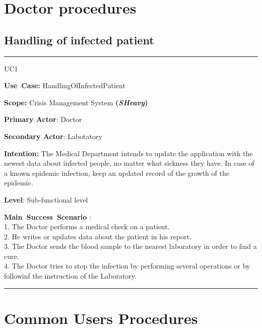 \section{Doctor procedures}

\subsection{Handling of infected patient}
\vspace{0.5cm}
\hrule
\vspace{0.5cm}
\begin{lyxlist}{UC1}
\small{
\item [\textbf{Use~Case:}] HandlingOfInfectedPatient
\item [\textbf{Scope:}] Crisis Management System \textbf{(\emph{SHeavy})}
\item [\textbf{Primary Actor}:] Doctor
\item [\textbf{Secondary Actor}:] Labotatory
\item [\textbf{Intention:}]The Medical Department intends to update
the application with the newest data about infected people, no matter what
sickness they have. In case of a known epidemic infection, keep an updated
record of the growth of the epidemic.
\item [\textbf{Level}:]Sub-functional level
\item [\textbf{Main~Success~Scenario}]:\\
1. The Doctor performs a medical check on a patient.\\
2. He writes or updates data about the patient in his report.\\
3. The Doctor sends the blood sample to the nearest laboratory in order to find
a cure.\\
4. The Doctor tries to stop the infection by performing several operations or
by followinf the instruction of the Laboratory.\\
}
\end{lyxlist}
\hrule
\vspace{0.5cm} 

\section{Common Users Procedures}

